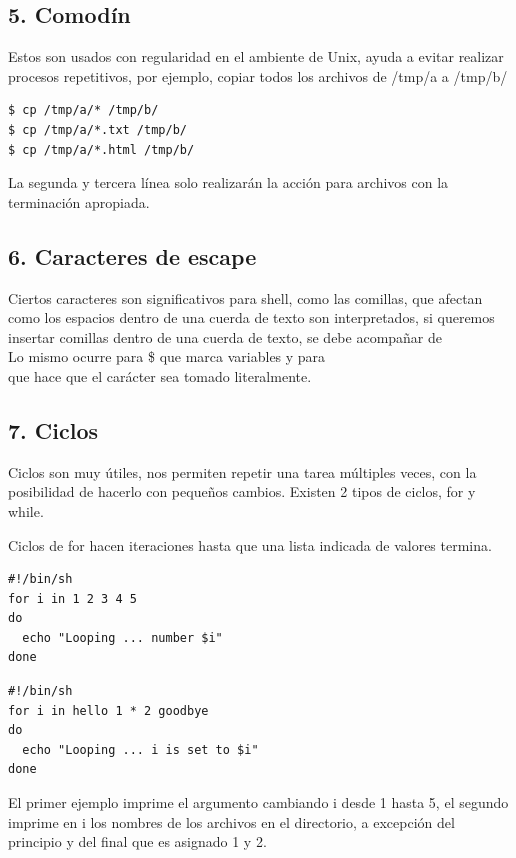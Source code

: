\documentclass[a4paper]{article}
\begin{document}
\subsection*{5. Comodín}

Estos son usados con regularidad en el ambiente de Unix, ayuda a evitar realizar procesos repetitivos, por ejemplo, copiar todos los archivos de /tmp/a a /tmp/b/

\begin{verbatim}
$ cp /tmp/a/* /tmp/b/
$ cp /tmp/a/*.txt /tmp/b/
$ cp /tmp/a/*.html /tmp/b/
\end{verbatim}

La segunda y tercera línea solo realizarán la acción para archivos con la terminación apropiada.

\subsection*{6. Caracteres de escape}

Ciertos caracteres son significativos para shell, como las comillas, que afectan como los espacios dentro de una cuerda de texto son interpretados, si queremos insertar comillas dentro de una cuerda de texto, se debe acompañar de \\

Lo mismo ocurre para \$ que marca variables y para \\ que hace que el carácter sea tomado literalmente.

\subsection*{7. Ciclos}

Ciclos son muy útiles, nos permiten repetir una tarea múltiples veces, con la posibilidad de hacerlo con pequeños cambios. Existen 2 tipos de ciclos, for y while.

Ciclos de for hacen iteraciones hasta que una lista indicada de valores termina.

\begin{verbatim}
#!/bin/sh
for i in 1 2 3 4 5
do
  echo "Looping ... number $i"
done
\end{verbatim}

\begin{verbatim}
#!/bin/sh
for i in hello 1 * 2 goodbye 
do
  echo "Looping ... i is set to $i"
done
\end{verbatim}

El primer ejemplo imprime el argumento cambiando i desde 1 hasta 5, el segundo imprime en i los nombres de los archivos en el directorio, a excepción del principio y del final que es asignado 1 y 2.
\end{document}
